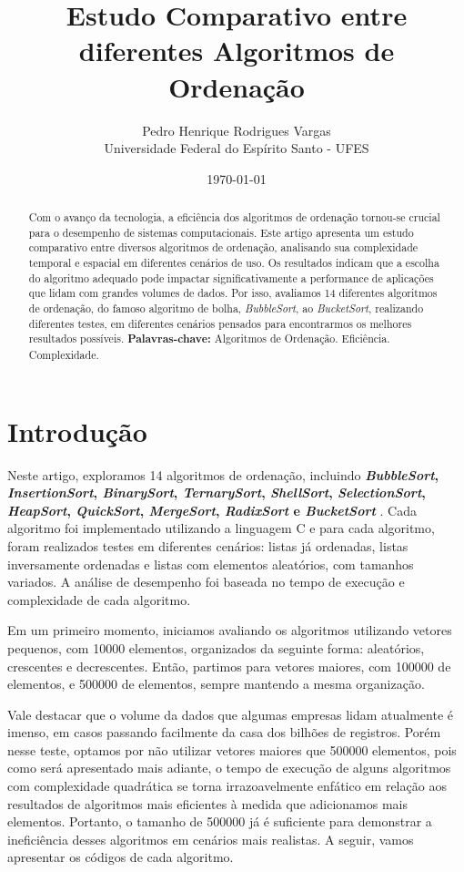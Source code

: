 \documentclass[a4paper, 12pt]{article} %
\title{Estudo Comparativo entre diferentes Algoritmos de Ordenação}
\author{Pedro Henrique Rodrigues Vargas\\ \small Universidade Federal do Espírito Santo - UFES \\ \small}
\date{\today}
\begin{document}
\maketitle %

\begin{abstract}
    Com o avanço da tecnologia, a eficiência dos algoritmos de ordenação 
    tornou-se crucial para o desempenho de sistemas computacionais. 
    Este artigo apresenta um estudo comparativo entre diversos algoritmos de ordenação, analisando sua 
    complexidade temporal e espacial em diferentes cenários de uso. Os resultados indicam que a escolha do 
    algoritmo adequado pode impactar significativamente a performance de aplicações que lidam com grandes volumes de dados. 
    Por isso, avaliamos 14 diferentes algoritmos de ordenação, do famoso algoritmo de bolha, 
    \textit{BubbleSort}, ao \textit{BucketSort}, realizando diferentes testes, em diferentes cenários pensados 
    para encontrarmos os melhores resultados possíveis.
    \textbf{Palavras-chave:} Algoritmos de Ordenação. Eficiência. Complexidade.
\end{abstract}

\section{Introdução}
Neste artigo, exploramos 14 algoritmos de ordenação, incluindo 
\textbf{
    \textit{BubbleSort},
    \textit{InsertionSort},
    \textit{BinarySort},
    \textit{TernarySort},
    \textit{ShellSort},
    \textit{SelectionSort},
    \textit{HeapSort},
    \textit{QuickSort},
    \textit{MergeSort},
    \textit{RadixSort} e
    \textit{BucketSort}
}. 
Cada algoritmo foi implementado utilizando a linguagem C e para cada algoritmo, foram realizados testes em diferentes cenários: 
listas já ordenadas, listas inversamente ordenadas e listas com elementos aleatórios, com tamanhos variados. 
A análise de desempenho foi baseada no tempo de execução e complexidade de cada algoritmo.

Em um primeiro momento, iniciamos avaliando os algoritmos utilizando vetores pequenos, com 10000 elementos, 
organizados da seguinte forma: aleatórios, crescentes e decrescentes. Então, partimos para vetores maiores, com 100000 de elementos, e 500000 de elementos, 
sempre mantendo a mesma organização. 

Vale destacar que o volume da dados que algumas empresas lidam atualmente é imenso, em casos passando facilmente da casa 
dos bilhões de registros. Porém nesse teste, optamos por não utilizar vetores maiores que 500000 elementos, pois como será apresentado mais adiante, o tempo de execução 
de alguns algoritmos com complexidade quadrática se torna irrazoavelmente enfático em relação aos resultados de algoritmos mais eficientes à medida que adicionamos mais elementos. Portanto, o tamanho de 
500000 já é suficiente para demonstrar a ineficiência desses algoritmos em cenários mais realistas. A seguir, vamos apresentar os códigos de cada algoritmo.
\end{document}
